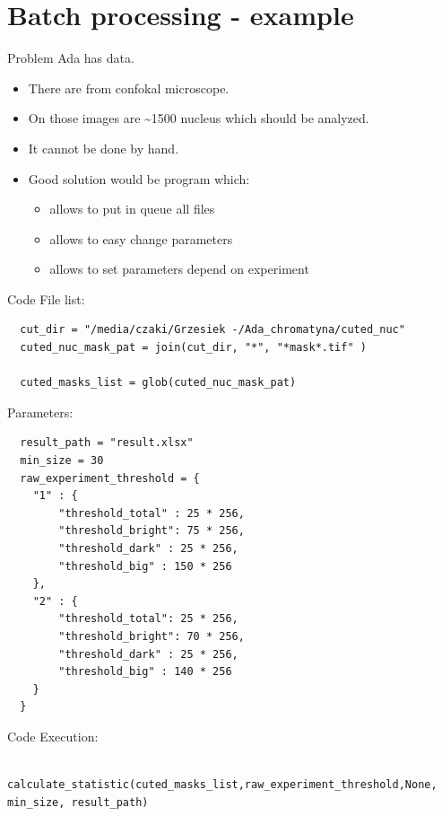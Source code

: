 \documentclass[10pt,usenames,dvipsnames]{beamer}
\begin{document}
\section{Batch processing - example}
\begin{frame}[c]{Problem}
  Ada has data. 
  \begin{itemize}
    \item There are from confokal microscope. 
    \item On those images are \textasciitilde 1500 nucleus which should be analyzed.
    \item<2-> It cannot be done by hand.
    \item<3-> Good solution would be program which:
      \begin{itemize}
        \item allows to put in queue all files
        \item allows to easy change parameters
        \item allows to set parameters depend on experiment
      \end{itemize}
  \end{itemize}
\end{frame}
\begin{frame}[fragile,c]{Code}
  File list:
  \begin{lstlisting}
  cut_dir = "/media/czaki/Grzesiek -/Ada_chromatyna/cuted_nuc"
  cuted_nuc_mask_pat = join(cut_dir, "*", "*mask*.tif" )
    
  cuted_masks_list = glob(cuted_nuc_mask_pat)
  \end{lstlisting}
  Parameters:
  \begin{lstlisting}
  result_path = "result.xlsx"
  min_size = 30  
  raw_experiment_threshold = {
    "1" : {
        "threshold_total" : 25 * 256,
        "threshold_bright": 75 * 256,
        "threshold_dark" : 25 * 256,
        "threshold_big" : 150 * 256
    },
    "2" : {
        "threshold_total": 25 * 256,
        "threshold_bright": 70 * 256,
        "threshold_dark" : 25 * 256,
        "threshold_big" : 140 * 256
    }
  }
  \end{lstlisting}
\end{frame}
\begin{frame}[fragile,c]{Code}
    Execution:
    \begin{lstlisting}
    calculate_statistic(cuted_masks_list,raw_experiment_threshold,None, min_size, result_path)
    \end{lstlisting}
\end{frame}
\end{document}
